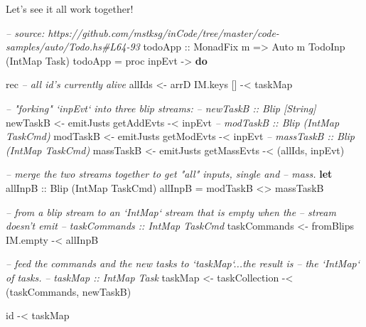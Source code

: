 \documentclass[]{article}
\newenvironment{Shaded}{\begin{snugshade}}{\end{snugshade}}
\newcommand{\CommentTok}[1]{\textcolor[rgb]{0.56,0.35,0.01}{\textit{#1}}}
\newcommand{\DataTypeTok}[1]{\textcolor[rgb]{0.13,0.29,0.53}{#1}}
\newcommand{\FunctionTok}[1]{\textcolor[rgb]{0.00,0.00,0.00}{#1}}
\newcommand{\KeywordTok}[1]{\textcolor[rgb]{0.13,0.29,0.53}{\textbf{#1}}}
\newcommand{\NormalTok}[1]{#1}
\newcommand{\OtherTok}[1]{\textcolor[rgb]{0.56,0.35,0.01}{#1}}
\begin{document}
Let's see it all work together!

\begin{Shaded}
\begin{Highlighting}[]
\CommentTok{-- source: https://github.com/mstksg/inCode/tree/master/code-samples/auto/Todo.hs#L64-93}
\OtherTok{todoApp ::} \DataTypeTok{MonadFix}\NormalTok{ m }\OtherTok{=>} \DataTypeTok{Auto}\NormalTok{ m }\DataTypeTok{TodoInp}\NormalTok{ (}\DataTypeTok{IntMap} \DataTypeTok{Task}\NormalTok{)}
\NormalTok{todoApp }\FunctionTok{=}\NormalTok{ proc inpEvt }\OtherTok{->} \KeywordTok{do}

\NormalTok{    rec }\CommentTok{-- all id's currently alive}
\NormalTok{        allIds }\OtherTok{<-}\NormalTok{ arrD IM.keys [] }\FunctionTok{-<}\NormalTok{ taskMap}

        \CommentTok{-- "forking" `inpEvt` into three blip streams:}
        \CommentTok{-- newTaskB :: Blip [String]}
\NormalTok{        newTaskB  }\OtherTok{<-}\NormalTok{ emitJusts getAddEvts  }\FunctionTok{-<}\NormalTok{ inpEvt}
        \CommentTok{-- modTaskB :: Blip (IntMap TaskCmd)}
\NormalTok{        modTaskB  }\OtherTok{<-}\NormalTok{ emitJusts getModEvts  }\FunctionTok{-<}\NormalTok{ inpEvt}
        \CommentTok{-- massTaskB :: Blip (IntMap TaskCmd)}
\NormalTok{        massTaskB }\OtherTok{<-}\NormalTok{ emitJusts getMassEvts }\FunctionTok{-<}\NormalTok{ (allIds, inpEvt)}

        \CommentTok{-- merge the two streams together to get "all" inputs, single and}
        \CommentTok{-- mass.}
        \KeywordTok{let}\OtherTok{ allInpB ::} \DataTypeTok{Blip}\NormalTok{ (}\DataTypeTok{IntMap} \DataTypeTok{TaskCmd}\NormalTok{)}
\NormalTok{            allInpB }\FunctionTok{=}\NormalTok{ modTaskB }\FunctionTok{<>}\NormalTok{ massTaskB}

        \CommentTok{-- from a blip stream to an `IntMap` stream that is empty when the}
        \CommentTok{-- stream doesn't emit}
        \CommentTok{-- taskCommands :: IntMap TaskCmd}
\NormalTok{        taskCommands }\OtherTok{<-}\NormalTok{ fromBlips IM.empty }\FunctionTok{-<}\NormalTok{ allInpB}

        \CommentTok{-- feed the commands and the new tasks to `taskMap`...the result is}
        \CommentTok{-- the `IntMap` of tasks.}
        \CommentTok{-- taskMap :: IntMap Task}
\NormalTok{        taskMap }\OtherTok{<-}\NormalTok{ taskCollection }\FunctionTok{-<}\NormalTok{ (taskCommands, newTaskB)}

\NormalTok{    id }\FunctionTok{-<}\NormalTok{ taskMap}
\end{Highlighting}
\end{Shaded}
\end{document}
